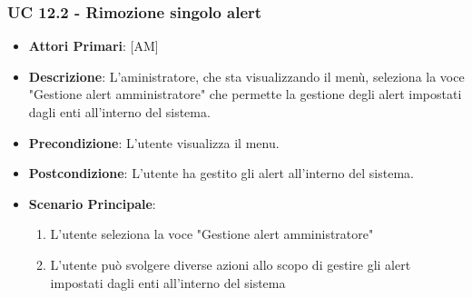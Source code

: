 		\subsubsection{UC 12.2 - Rimozione singolo alert}
		\begin{itemize}
			\item \textbf{Attori Primari}: [AM]
			\item \textbf{Descrizione}: L'aministratore, che sta visualizzando il menù, seleziona la voce "Gestione alert amministratore" che permette la gestione degli alert impostati dagli enti all'interno del sistema.
			\item \textbf{Precondizione}: L'utente visualizza il menu.
			\item \textbf{Postcondizione}: L'utente ha gestito gli alert all'interno del sistema.
			\item \textbf{Scenario Principale}:
			\begin{enumerate}
				\item{L'utente seleziona la voce "Gestione alert amministratore"}
				\item{L'utente può svolgere diverse azioni allo scopo di gestire gli alert impostati dagli enti all'interno del sistema}
			\end{enumerate}	
		\end{itemize}